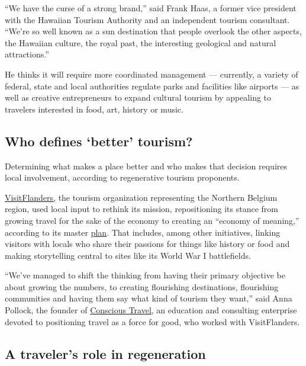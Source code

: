 ``We have the curse of a strong brand,'' said Frank Haas, a former vice
president with the Hawaiian Tourism Authority and an independent tourism
consultant. ``We're so well known as a sun destination that people
overlook the other aspects, the Hawaiian culture, the royal past, the
interesting geological and natural attractions.''

He thinks it will require more coordinated management --- currently, a
variety of federal, state and local authorities regulate parks and
facilities like airports --- as well as creative entrepreneurs to expand
cultural tourism by appealing to travelers interested in food, art,
history or music.

\hypertarget{who-defines-better-tourism}{%
\subsection{Who defines `better'
tourism?}\label{who-defines-better-tourism}}

Determining what makes a place better and who makes that decision
requires local involvement, according to regenerative tourism
proponents.

\href{https://www.visitflanders.com/en/?country=en_US}{VisitFlanders,}
the tourism organization representing the Northern Belgium region, used
local input to rethink its mission, repositioning its stance from
growing travel for the sake of the economy to creating an ``economy of
meaning,'' according to its master
\href{https://www.reizennaarmorgen.be/wp-content/uploads/2020/02/memorandum-eng.pdf}{plan}.
That includes, among other initiatives, linking visitors with locals who
share their passions for things like history or food and making
storytelling central to sites like its World War I battlefields.

``We've managed to shift the thinking from having their primary
objective be about growing the numbers, to creating flourishing
destinations, flourishing communities and having them say what kind of
tourism they want,'' said Anna Pollock, the founder of
\href{http://www.conscious.travel/}{Conscious Travel}, an education and
consulting enterprise devoted to positioning travel as a force for good,
who worked with VisitFlanders.

\hypertarget{a-travelers-role-in-regeneration}{%
\subsection{A traveler's role in
regeneration}\label{a-travelers-role-in-regeneration}}

